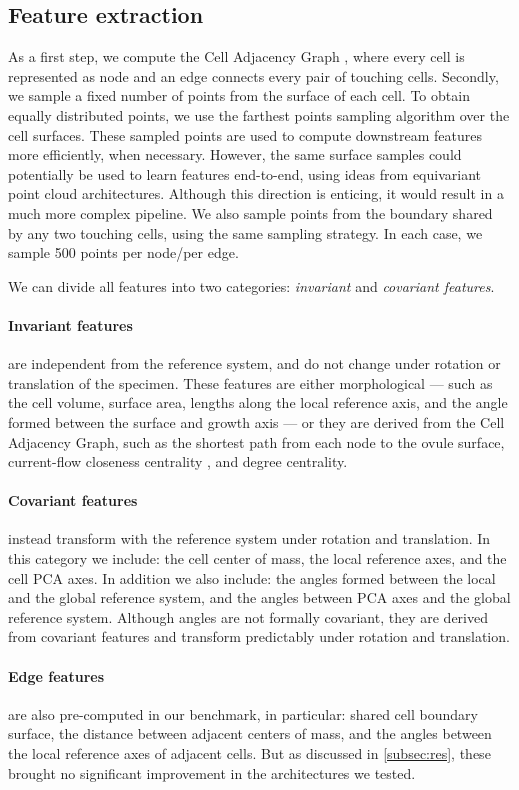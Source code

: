 \documentclass[10pt,twocolumn,letterpaper]{article}
\begin{document}
\subsection{Feature extraction}
\label{subsec:basic-feat}
As a first step, we compute the Cell Adjacency Graph , where every cell is represented as node  and an edge  connects every pair of touching cells.
Secondly, we sample a fixed number of points from the surface of each cell. To obtain equally distributed points, we use the farthest points sampling algorithm \cite{qi2017pointnet++} over the cell surfaces.
These sampled points are used to compute downstream features more efficiently, when necessary. However, the same surface samples could potentially be used to learn features end-to-end, using ideas from equivariant point cloud architectures. Although this direction is enticing, it would result in a much more complex pipeline.
We also sample points from the boundary shared by any two touching cells, using the same sampling strategy. In each case, we sample 500 points per node/per edge.

We can divide all features into two categories: \textit{invariant} and \textit{covariant features}.
\paragraph{Invariant features} are independent from the reference system, and do not change under rotation or translation of the specimen. These features are either morphological --- such as the cell volume, surface area, lengths along the local reference axis, and the angle formed between the surface and growth axis --- or they are derived from the Cell Adjacency Graph, such as the shortest path from each node to the ovule surface, current-flow closeness centrality \cite{stephenson1989rethinking}, and degree centrality.
\paragraph{Covariant features} instead transform with the reference system under rotation and translation. In this category we include: the cell center of mass, the local reference axes, and the cell PCA axes. In addition we also include: the angles formed between the local and the global reference system, and the angles between PCA axes and the global reference system. Although angles are not formally covariant, they are derived from covariant features and transform predictably under rotation and translation.
\paragraph{Edge features} are also pre-computed in our benchmark, in particular: shared cell boundary surface, the distance between adjacent centers of mass, and the angles between the local reference axes of adjacent cells. But as discussed in \cref{subsec:res}, these brought no significant improvement in the architectures we tested.
\end{document}
